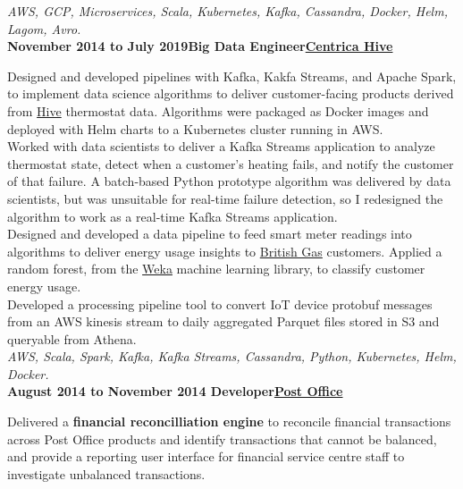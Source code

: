 \documentclass[a4paper,12pt]{article}
\newcommand{\clientwork}[3]{\textbf{#1\hfill#3\hfill#2}\nopagebreak}
\newcommand{\renewals}[1]{}
\newcommand{\techstack}[1]{\textit{#1}}
\begin{document}
\techstack{AWS, GCP, Microservices, Scala, Kubernetes, Kafka, Cassandra, Docker, Helm, Lagom, Avro.}\\

\clientwork{November 2014 to July 2019}{\href{https://www.hivehome.com}{Centrica Hive}}{Big Data Engineer}

\renewals{5}

Designed and developed pipelines with Kafka, Kakfa Streams, and Apache Spark, to implement data science algorithms to deliver customer-facing products derived from \href{https://www.hivehome.com}{Hive} thermostat data. Algorithms were packaged as Docker images and deployed with Helm charts to a Kubernetes cluster running in AWS.\\

Worked with data scientists to deliver a Kafka Streams application to analyze thermostat state, detect when a customer's heating fails, and notify the customer of that failure. A batch-based Python prototype algorithm was delivered by data scientists, but was unsuitable for real-time failure detection, so I redesigned the algorithm to work as a real-time Kafka Streams application.\\

Designed and developed a data pipeline to feed smart meter readings into algorithms to deliver energy usage insights to \href{https://www.britishgas.co.uk}{British Gas} customers. Applied a random forest, from the \href{https://www.cs.waikato.ac.nz/ml/weka/}{Weka} machine learning library, to classify customer energy usage. \\

Developed a processing pipeline tool to convert IoT device protobuf messages from an AWS kinesis stream to daily aggregated Parquet files stored in S3 and queryable from Athena.\\

\techstack{AWS, Scala, Spark, Kafka, Kafka Streams, Cassandra, Python, Kubernetes, Helm, Docker.}\\

\clientwork{August 2014 to November 2014 }{\href{http://www.postoffice.co.uk/}{Post Office}}{Developer}

Delivered a \textbf{financial reconcilliation engine} to reconcile financial transactions across Post Office products and identify transactions that cannot be balanced, and provide a reporting user interface for financial service centre staff to investigate unbalanced transactions.\\
\end{document}
